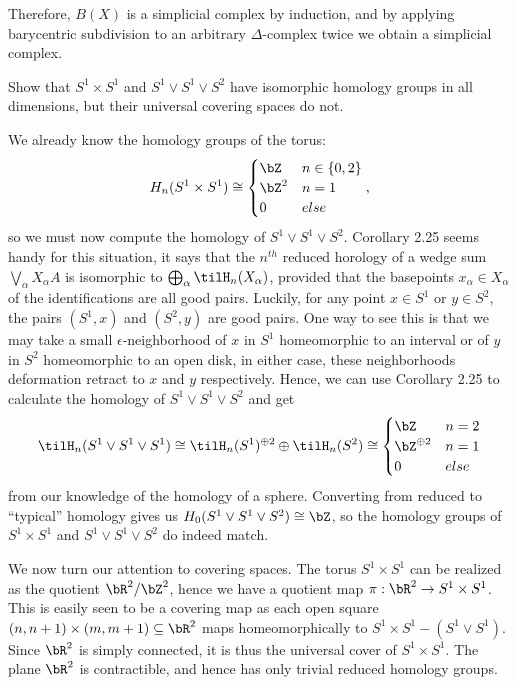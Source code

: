 \begin{homework}[e]
\begin{prf}
    Therefore, $B(X)$ is a simplicial complex by induction, and by applying barycentric subdivision to an arbitrary $\Delta$-complex twice we obtain a simplicial complex.
  \end{prf}
   Show that $S^1\times S^1$ and $S^1 \vee S^1 \vee S^2$ have isomorphic homology groups in all dimensions, but their universal covering spaces do not.
  \begin{prf}
    We already know the homology groups of the torus:
    \begin{align*}
      H_n(S^1\times S^1) \cong
      \begin{cases}
        \bZ & n \in \{0,2\} \\
        \bZ^2 & n = 1 \\
        0 & else
      \end{cases},
    \end{align*}
    so we must now compute the homology of $S^1\vee S^1\vee S^2$. Corollary 2.25 seems handy for this situation, it says that the $n^{th}$ reduced horology of a wedge sum $\bigvee_\alpha X_\alpha A$ is isomorphic to $\bigoplus_\alpha \tilH_n(X_\alpha)$, provided that the basepoints $x_\alpha \in X_\alpha$ of the identifications are all good pairs. Luckily, for any point $x \in S^1$ or $y \in S^2$, the pairs $(S^1,x)$ and $(S^2,y)$ are good pairs. One way to see this is that we may take a small $\epsilon$-neighborhood of $x$ in $S^1$ homeomorphic to an interval or of $y$ in $S^2$ homeomorphic to an open disk, in either case, these neighborhoods deformation retract to $x$ and $y$ respectively. Hence, we can use Corollary 2.25 to calculate the homology of $S^1\vee S^1\vee S^2$ and get
    \begin{align*}
      \tilH_{n}(S^1\vee S^1 \vee S^1) \cong \tilH_n(S^1)^{\oplus 2} \oplus \tilH_n(S^2) \cong 
      \begin{cases}
        \bZ & n = 2 \\
        \bZ^{\oplus 2} & n = 1 \\
        0 & else
      \end{cases}
    \end{align*}
    from our knowledge of the homology of a sphere. Converting from reduced to ``typical'' homology gives us $H_0(S^1\vee S^1\vee S^2) \cong \bZ$, so the homology groups of $S^1\times S^1$ and $S^1\vee S^1\vee S^2$ do indeed match.

    \bigskip

    We now turn our attention to covering spaces. The torus $S^1\times S^1$ can be realized as the quotient $\bR^2/\bZ^2$, hence we have a quotient map $\pi:\bR^2 \to S^1\times S^1$. This is easily seen to be a covering map as each open square $(n,n+1)\times (m,m+1)\subseteq \bR^2$ maps homeomorphically to $S^1\times S^1 - (S^1\vee S^1)$. Since $\bR^2$ is simply connected, it is thus the universal cover of $S^1\times S^1$. The plane $\bR^2$ is contractible, and hence has only trivial reduced homology groups.


\end{prf}
\end{homework}
